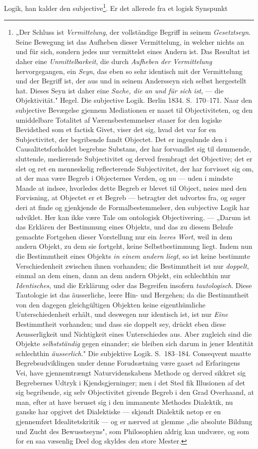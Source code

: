 \documentclass[12pt]{article}
\newcommand{\opage}[1]{\marginnote{\footnotesize\textit{[#1]}}}
\begin{document}
Logik, han kalder den subjective\footnote{„Der Schluss ist
\emph{Vermittelung}, der vollständige Begriff in seinem
\emph{Gesetztseyn}. Seine Bewegung ist das Aufheben dieser
Vermittelung, in welcher nichts an und für sich, sondern jedes nur
vermittelst eines Andern ist. Das Resultat ist daher eine
\emph{Unmittelbarkeit}, die durch \emph{Aufheben der Vermittelung}
hervorgegangen, ein \emph{Seyn}, das eben so sehr identisch mit der
Vermittelung und der Begriff ist, der aus und in seinem Andersseyn
sich selbst hergestellt hat. Dieses Seyn ist daher eine \emph{Sache,
die an und für sich ist}, --- die Objektivität." Hegel. Die
subjective Logik. Berlin 1834. S.\ 170--171. Naar den subjective
\opage{35} Bevægelse gjennem Mediationen er naaet til Objectiviteten, og den
umiddelbare Totalitet af Værensbestemmelser staaer for den logiske
Bevidsthed som et factisk Givet, viser det sig, hvad det var for en
Subjectivitet, der begribende fandt Objectet. Det er ingenlunde den
i Causalitetsforholdet begrebne Substans, der har forvandlet sig til
dømmende, sluttende, medierende Subjectivitet og derved frembragt
det Objective; det er slet og ret en menneskelig reflecterende
Subjectivitet, der har forvisset sig om, at der maa være Begreb i
Objecternes Verden, og nu --- uden i mindste Maade at indsee,
hvorledes dette Begreb er blevet til Object, nøies med den
Forvisning, at Objectet er et Begreb --- betragter det udvortes fra,
og søger deri at finde og gjenkjende de Formalbestemmelser, den
subjective Logik har udviklet. Her kan ikke være Tale om ontologisk
Objectivering. --- „Darum ist das Erklären der Bestimmung eines
Objekts, und das zu diesem Behufe gemachte Fortgehen dieser
Vorstellung nur ein \emph{leeres Wort}, weil in dem andern Objekt,
zu dem sie fortgeht, keine Selbstbestimmung liegt. Indem nun die
Bestimmtheit eines Objekts \emph{in einem andern liegt}, so ist
keine bestimmte Verschiedenheit zwischen ihnen vorhanden; die
Bestimmtheit ist nur \emph{doppelt}, einmal an dem einen, dann an
dem andern Objekt, ein schlechthin nur \emph{Identisches}, und die
Erklärung oder das Begreifen insofern \emph{tautologisch}. Diese
Tautologie ist das äusserliche, leere Hin- und Hergehen; da die
Bestimmtheit von den dagegen gleichgültigen Objekten keine
eigenthümliche Unterschiedenheit erhält, und deswegen nur identisch
ist, ist nur \emph{Eine} Bestimmtheit vorhanden; und dass sie
doppelt sey, drückt eben diese Aeusserligkeit und Nichtigkeit eines
Unterschiedes aus. Aber zugleich sind die Objekte \emph{selbstständig}
gegen einander; sie bleiben sich darum in jener Identität
schlechthin \emph{äusserlich}." Die subjektive Logik. S.\ 183--184.
Conseqvent maatte Begrebsudviklingen under denne Forudsætning være
gaaet ad Erfaringens Vei, have gjennemtrængt Naturvidenskabens
Methode og derved sikkret sig Begrebernes Udtryk i Kjendsgjerninger;
men i det Sted fik Illusionen af det sig begribende, sig selv
Objectivitet givende Begreb i den Grad Overhaand, at man, efter at
have beruset sig i den immanente Methodes Dialektik, nu ganske har
opgivet det Dialektiske --- skjøndt Dialektik netop er en
gjennemført Idealitetskritik --- og er nærved at glemme „die
absolute Bildung und Zucht des Bewusstseyns", som Philosophien
aldrig kan undvære, og som for en saa væsenlig Deel dog skyldes den
store Mester.}. Er det allerede fra et logisk Syns\-punkt
\end{document}
